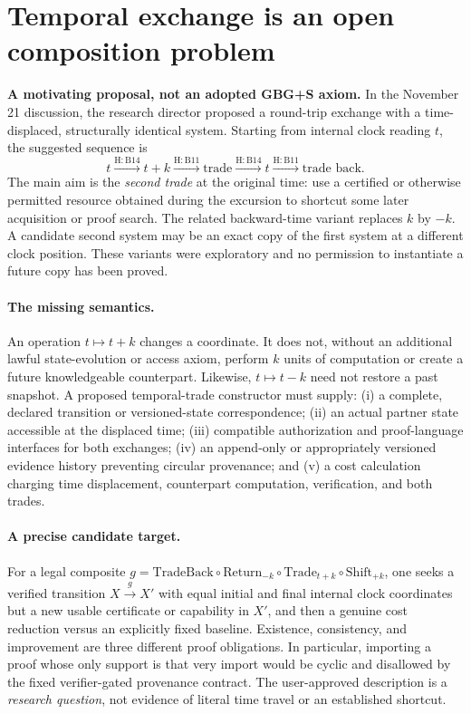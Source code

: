 \documentclass[11pt,letterpaper]{article}
\theoremstyle{definition}\newtheorem{definition}[theorem]{Definition}\newtheorem{example}[theorem]{Example}
\theoremstyle{remark}\newtheorem{remark}[theorem]{Remark}
\begin{document}
\section{Temporal exchange is an open composition problem}\label{br:sec:temporal}
\textbf{A motivating proposal, not an adopted GBG+S axiom.} In the November 21 discussion, the research director proposed a round-trip exchange with a time-displaced, structurally identical system. Starting from internal clock reading $t$, the suggested sequence is
\[
 t\xrightarrow{\mathrm{H:B14}}t+k\xrightarrow{\mathrm{H:B11}}\text{trade}
 \xrightarrow{\mathrm{H:B14}}t\xrightarrow{\mathrm{H:B11}}\text{trade back}.
\]
The main aim is the \emph{second trade} at the original time: use a certified or otherwise permitted resource obtained during the excursion to shortcut some later acquisition or proof search. The related backward-time variant replaces $k$ by $-k$. A candidate second system may be an exact copy of the first system at a different clock position. These variants were exploratory and no permission to instantiate a future copy has been proved.

\paragraph{The missing semantics.} An operation $t\mapsto t+k$ changes a coordinate. It does not, without an additional lawful state-evolution or access axiom, perform $k$ units of computation or create a future knowledgeable counterpart. Likewise, $t\mapsto t-k$ need not restore a past snapshot. A proposed temporal-trade constructor must supply: (i) a complete, declared transition or versioned-state correspondence; (ii) an actual partner state accessible at the displaced time; (iii) compatible authorization and proof-language interfaces for both exchanges; (iv) an append-only or appropriately versioned evidence history preventing circular provenance; and (v) a cost calculation charging time displacement, counterpart computation, verification, and both trades.

\paragraph{A precise candidate target.} For a legal composite $g=\mathrm{TradeBack}\circ\mathrm{Return}_{-k}\circ\mathrm{Trade}_{t+k}\circ\mathrm{Shift}_{+k}$, one seeks a verified transition $X\xrightarrow{g}X'$ with equal initial and final internal clock coordinates but a new usable certificate or capability in $X'$, and then a genuine cost reduction versus an explicitly fixed baseline. Existence, consistency, and improvement are three different proof obligations. In particular, importing a proof whose only support is that very import would be cyclic and disallowed by the fixed verifier-gated provenance contract. The user-approved description is a \emph{research question}, not evidence of literal time travel or an established shortcut.
\end{document}
